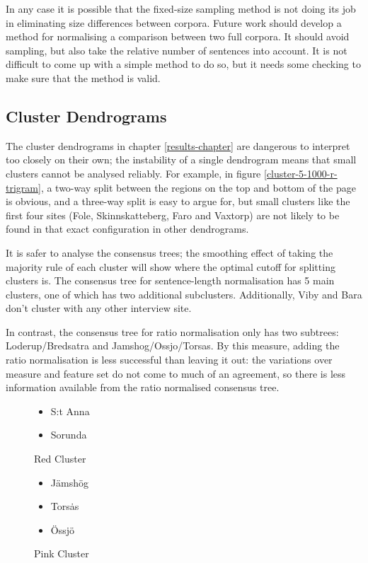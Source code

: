 In any case it is possible that the fixed-size sampling method is not doing its
job in eliminating size differences between corpora. Future work
should develop a method for normalising a comparison between two full
corpora. It should avoid sampling, but also take the relative number
of sentences into account. It is not difficult to come up
with a simple method to do so, but it needs some checking to make sure
that the method is valid.

\subsection{Cluster Dendrograms}

The cluster dendrograms in chapter \ref{results-chapter} are dangerous
to interpret too closely on their own; the instability of a single
dendrogram means that small clusters cannot be analysed reliably. For
example, in figure \ref{cluster-5-1000-r-trigram}, a two-way split
between the regions on the top and bottom of the page is
obvious, and a three-way split is easy to argue for, but small
clusters like the first four sites (Fole, Skinnskatteberg, Faro and
Vaxtorp) are not likely to be found in that exact configuration in
other dendrograms.

It is safer to analyse the consensus trees; the smoothing effect of
taking the majority rule of each cluster will show where the optimal
cutoff for splitting clusters is. The consensus tree for
sentence-length normalisation has 5 main clusters, one of which has
two additional subclusters. Additionally, Viby and Bara don't cluster
with any other interview site.

In contrast, the consensus tree for ratio normalisation only has two
subtrees: Loderup/Bredsatra and Jamshog/Ossjo/Torsas. By this measure,
adding the ratio normalisation is less successful than leaving it out:
the variations over measure and feature set do not come to much of an
agreement, so there is less information available from the ratio
normalised consensus tree.

\begin{figure}
\begin{itemize}
\item S:t Anna
\item Sorunda
\end{itemize}
\caption{Red Cluster}
\label{red-cluster}
\end{figure}

\begin{figure}
\begin{itemize}
\item J\"amsh\"og
\item Tors\.as
\item \"Ossj\"o
\end{itemize}
\caption{Pink Cluster}
\label{pink-cluster}
\end{figure}

